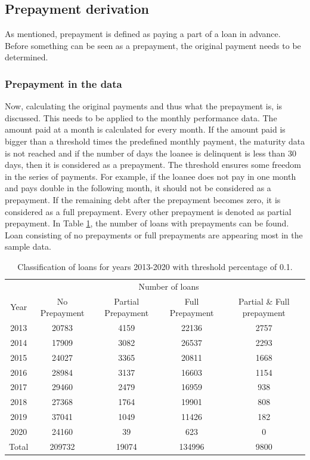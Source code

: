 \subsection{Prepayment derivation}
    As mentioned, prepayment is defined as paying a part of a loan 
    in advance. Before something can be seen as a prepayment, the 
    original payment needs to be determined.
    
    
    \subsubsection{Prepayment in the data}
        Now, calculating the original payments and thus what the 
        prepayment is, is discussed. This needs to be applied to 
        the monthly performance data. The amount paid at a month 
        is calculated for every month. If the amount paid is bigger 
        than a threshold times the predefined monthly payment, 
        the maturity data is not reached and if the number of days 
        the loanee is delinquent is less than 30 days, then it is 
        considered as a prepayment. The threshold ensures some 
        freedom in the series of payments. For example, if the loanee 
        does not pay in one month and pays double in the following 
        month, it should not be considered as a prepayment. If the 
        remaining debt after the prepayment becomes zero, it is 
        considered as a full prepayment. Every other prepayment 
        is denoted as partial prepayment. In Table 
        \ref{model_classficationprepayment_table}, the number of 
        loans with prepayments can be found. Loan consisting of 
        no prepayments or full prepayments are appearing most in 
        the sample data. 
        \begin{table}[H]
        \centering
            \begin{tabular}{c|c|c|c|c}
                & \multicolumn{4}{c}{Number of loans} \\
                Year&No Prepayment&Partial Prepayment&Full Prepayment&Partial \& Full prepayment  \\\hline
                2013 & 20783 & 4159 & 22136 & 2757\\
                2014 & 17909 & 3082 & 26537 & 2293\\
                2015 & 24027 & 3365 & 20811 & 1668 \\
                2016 & 28984 & 3137 & 16603 & 1154 \\
                2017 & 29460 & 2479 & 16959 & 938 \\
                2018 & 27368 & 1764 & 19901 & 808 \\
                2019 & 37041 & 1049 & 11426 & 182 \\
                2020 & 24160 & 39 & 623 & 0 \\\hline
                Total & 209732 & 19074 & 134996 & 9800
		    \end{tabular}
		    \caption{Classification of loans for years 2013-2020 with threshold percentage of 0.1.}
		    \label{model_classficationprepayment_table}
        \end{table}

